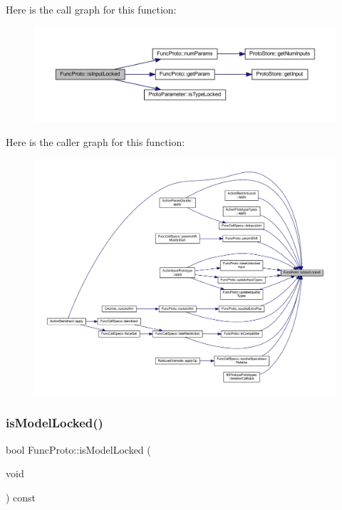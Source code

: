 Here is the call graph for this function\+:
\nopagebreak
\begin{figure}[H]
\begin{center}
\leavevmode
\includegraphics[width=350pt]{class_func_proto_aab52f093617d8bd8a67f011ba5a0d324_cgraph}
\end{center}
\end{figure}
Here is the caller graph for this function\+:
\nopagebreak
\begin{figure}[H]
\begin{center}
\leavevmode
\includegraphics[width=350pt]{class_func_proto_aab52f093617d8bd8a67f011ba5a0d324_icgraph}
\end{center}
\end{figure}
\mbox{\label{class_func_proto_a34162359ab3bd910a376bdad196f52e0}} 
\subsubsection{\texorpdfstring{isModelLocked()}{isModelLocked()}}
{\footnotesize\ttfamily bool Func\+Proto\+::is\+Model\+Locked (\begin{DoxyParamCaption}\item[{void}]{ }\end{DoxyParamCaption}) const\hspace{0.3cm}{\ttfamily [inline]}}



